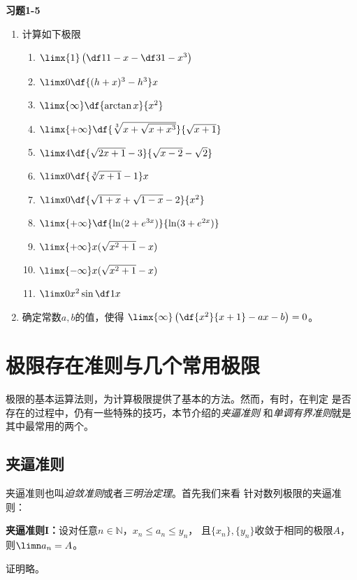 \bs
\begin{ext}
	{\centering\bf 习题1-5}
	\begin{enumerate}  
	  \item 计算如下极限
	  \begin{enumerate}[(1)]
	    \item $\limx{1}\left(\df1{1-x}-\df3{1-x^3}\right)$
	    \item $\limx0\df{(h+x)^3-h^3}x$
	    \item $\limx{\infty}\df{\arctan x}{x^2}$
	    \item $\limx{+\infty}\df{\sqrt[3]{x+\sqrt{x+x^3}}}
	    {\sqrt{x+1}}$
	    \item $\limx4\df{\sqrt{2x+1}-3}{\sqrt{x-2}-\sqrt2}$
	    \item $\limx0\df{\sqrt[3]{x+1}-1}x$
	    \item $\limx0\df{\sqrt{1+x}+\sqrt{1-x}-2}{x^2}$
	    \item $\limx{+\infty}\df{\ln(2+e^{3x})}{\ln(3+e^{2x})}$
	    \item $\limx{+\infty}x(\sqrt{x^2+1}-x)$
	    \item $\limx{-\infty}x(\sqrt{x^2+1}-x)$
	    \item $\limx0x^2\sin\df1x$
	  \end{enumerate}
	  \item 确定常数$a,b$的值，使得
	  $\limx{\infty}\left(\df{x^2}{x+1}-ax-b\right)=0$。
	\end{enumerate}
\end{ext}

\newpage
\section{极限存在准则与几个常用极限}

极限的基本运算法则，为计算极限提供了基本的方法。然而，有时，在判定
是否存在的过程中，仍有一些特殊的技巧，本节介绍的{\it 夹逼准则}
和{\it 单调有界准则}就是其中最常用的两个。

\subsection{夹逼准则}

夹逼准则也叫{\it 迫敛准则}或者{\it 三明治定理}。首先我们来看
针对数列极限的夹逼准则：
\begin{thx}
	{\bf 夹逼准则I：}设对任意$n\in\mathbb{N}$，$x_n\le a_n\le y_n$，
	且$\{x_n\},\{y_n\}$收敛于相同的极限$A$，则$\limn a_n=A$。
\end{thx}
证明略。

